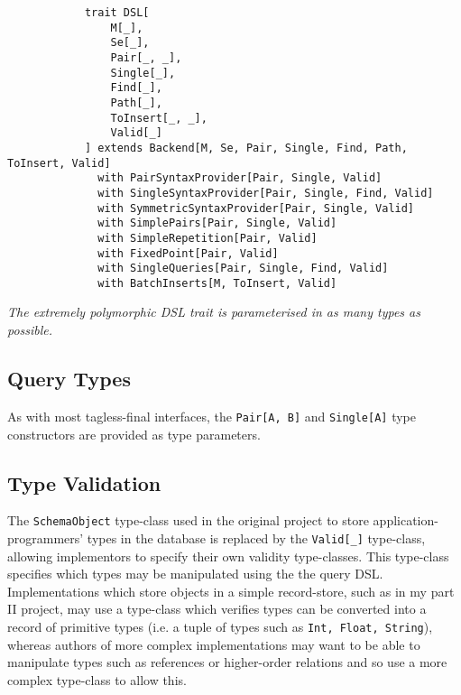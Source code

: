 \documentclass{report}
\newcommand \2[0]{\textbf{2}}
\newcommand \3[0]{\textbf{3}}
\begin{document}
\begin{framed}
    \begin{framed}
        \begin{verbatim}
            trait DSL[
                M[_], 
                Se[_], 
                Pair[_, _], 
                Single[_], 
                Find[_], 
                Path[_], 
                ToInsert[_, _], 
                Valid[_]
            ] extends Backend[M, Se, Pair, Single, Find, Path, ToInsert, Valid]
              with PairSyntaxProvider[Pair, Single, Valid]
              with SingleSyntaxProvider[Pair, Single, Find, Valid]
              with SymmetricSyntaxProvider[Pair, Single, Valid]
              with SimplePairs[Pair, Single, Valid]
              with SimpleRepetition[Pair, Valid]
              with FixedPoint[Pair, Valid]
              with SingleQueries[Pair, Single, Find, Valid]
              with BatchInserts[M, ToInsert, Valid]
        \end{verbatim}
  
    \end{framed}
    \textit{The extremely polymorphic DSL trait is parameterised in as many types as possible.}
\end{framed}


\subsection{Query Types}
As with most tagless-final interfaces, the \texttt{Pair[A, B]} and \texttt{Single[A]} type constructors are provided as type parameters.
\subsection{Type Validation}
The \texttt{SchemaObject} type-class used in the original project to store application-programmers' types in the database is replaced by the \texttt{Valid[_]} type-class, allowing implementors to specify their own validity type-classes. This type-class specifies which types may be manipulated using the the query DSL. Implementations which store objects in a simple record-store, such as in my part II project, may use a type-class which verifies types can be converted into a record of primitive types (i.e. a tuple of types such as \texttt{Int, Float, String}), whereas authors of more complex implementations may want to be able to manipulate types such as references or higher-order relations and so use a more complex type-class to allow this.
\end{document}
